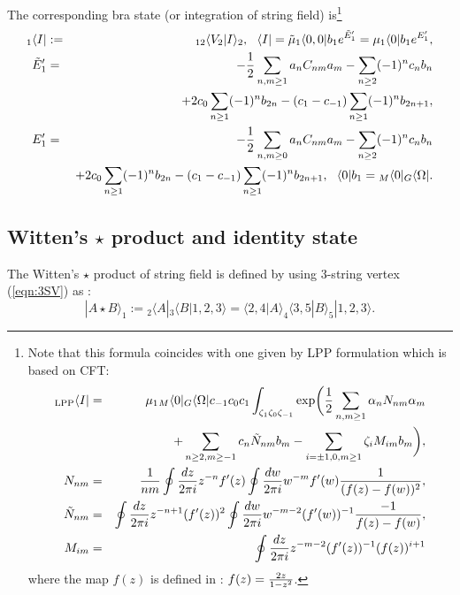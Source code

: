 \documentclass[12pt,a4paper]{article}
\begin{document}
The corresponding bra state (or integration of string field) is\footnote{
Note that this formula coincides with one given by LPP formulation \cite{LPP} which is based on CFT:
\begin{eqnarray}
{}_{\rm LPP}\langle I|&=&\mu_1{}_M\langle0|{}_G\langle\Omega|c_{-1}c_0c_1\int_{\zeta_1\zeta_0\zeta_{-1}}\exp\biggl({1\over2}\sum_{n,m\geq1}\alpha_nN_{nm}\alpha_m\nonumber \\
&&+\sum_{n\geq2,m\geq-1}c_n{\tilde N}_{nm}b_m-\sum_{i=\pm1,0,m\geq1}\zeta_iM_{im}b_m\biggr),\nonumber \\
N_{nm}&=&{1\over nm}\oint {dz\over2\pi i}z^{-n}f'(z)\oint {dw\over2\pi i}w^{-m}f'(w){1\over(f(z)-f(w))^2},\nonumber \\
{\tilde N}_{nm}&=&\oint {dz\over2\pi i}z^{-n+1}(f'(z))^2\oint {dw\over2\pi i}w^{-m-2}(f'(w))^{-1}{-1\over f(z)-f(w)},\nonumber \\
M_{im}&=&\oint {dz\over2\pi i}z^{-m-2}(f'(z))^{-1}(f(z))^{i+1}
\end{eqnarray}
where the map $f(z)$ is defined in \cite{RZ}: $f(z)={2z\over1-z^2}$.
}
\begin{eqnarray}
\label{eqn:IBR}
{}_1\langle I|&:=& {}_{12}\langle V_2|I\rangle_2, \ \ \langle I|={\tilde \mu}_1\langle0,0|b_1e^{{\tilde E}'_1}=\mu_1\langle0|b_1e^{E'_1}, \nonumber \\
{\tilde E}'_1 &=& -{1\over2}\sum_{n,m\geq1} a_n C_{nm}a_m - \sum_{n\geq2}(-1)^n c_n b_n\nonumber \\
&&+ 2 c_0 \sum_{n\geq1}(-1)^n b_{2n} - (c_1-c_{-1})\sum_{n\geq1}(-1)^n b_{2 n+1},\nonumber \\
E'_1 &=& -{1\over2}\sum_{n,m\geq0} a_n C_{nm} a_m - \sum_{n\geq2}(-1)^n c_n b_n\nonumber \\
&&+ 2 c_0 \sum_{n\geq1}(-1)^n b_{2n} - (c_1-c_{-1})\sum_{n\geq1}(-1)^n b_{2 n+1},\ \ \langle0|b_1= {}_M\langle0| {}_G\langle\Omega|.
\end{eqnarray}


\subsection{Witten's $\star$ product and identity state \label{sec:WITI}}

The Witten's $\star$ product of string field is defined by using 3-string vertex (\ref{eqn:3SV}) as :
\begin{equation}
\label{eqn:STR}
|A\star B\rangle_1:= {}_2\langle A| {}_3\langle B|1,2,3\rangle=\langle2,4|A\rangle_4 \langle3,5|B\rangle_5 |1,2,3\rangle.
\end{equation}
\end{document}
